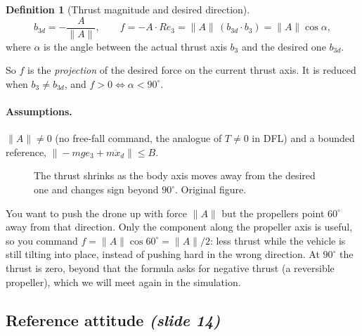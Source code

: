 \documentclass[11pt,a4paper]{article}
\newcommand{\sli}[1]{\emph{(#1)}}
\theoremstyle{definition}
\newtheorem{definition}{Definition}[section]
\theoremstyle{plain}
\theoremstyle{remark}
\begin{document}
\begin{definition}[Thrust magnitude and desired direction]
\[
b_{3d}=-\frac{A}{\|A\|},\qquad f=-A\cdot Re_3=\|A\|\,(b_{3d}\cdot b_3)=\|A\|\cos\alpha ,
\]
where $\alpha$ is the angle between the actual thrust axis $b_3$ and the desired one $b_{3d}$.
\end{definition}

So $f$ is the \emph{projection} of the desired force on the current thrust axis. It is reduced when $b_3\ne b_{3d}$, and $f>0\iff\alpha<90^\circ$.

\paragraph{Assumptions.} $\|A\|\ne0$ (no free-fall command, the analogue of $T\neq0$ in DFL) and a bounded reference, $\|-mge_3+m\ddot x_d\|\le B$.

\begin{figure}[h]
\centering
{}
\caption{The thrust shrinks as the body axis moves away from the desired one and changes sign beyond $90^\circ$. Original figure.}
\end{figure}

\begin{intuition}
You want to push the drone up with force $\|A\|$ but the propellers point $60^\circ$ away from that direction. Only the component along the propeller axis is useful, so you command $f=\|A\|\cos60^\circ=\|A\|/2$: less thrust while the vehicle is still tilting into place, instead of pushing hard in the wrong direction. At $90^\circ$ the thrust is zero, beyond that the formula asks for negative thrust (a reversible propeller), which we will meet again in the simulation.
\end{intuition}

\subsection{Reference attitude \sli{slide 14}}
\end{document}
